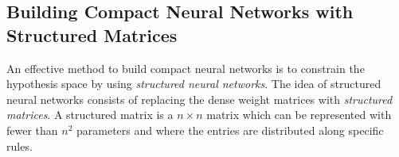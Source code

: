 \subsection{Building Compact Neural Networks with Structured Matrices}
\label{subsection:ch3-building_compact_neural_networks_with_structured_matrices}









An effective method to build compact neural networks is to constrain the hypothesis space by using \emph{structured neural networks}. 
The idea of structured neural networks consists of replacing the dense weight matrices with \emph{structured matrices}.
A structured matrix is a $n \times n$ matrix which can be represented with fewer than $n^2$ parameters and where the entries are distributed along specific rules.



